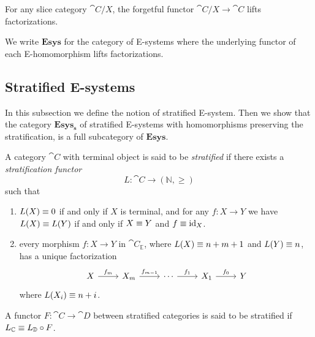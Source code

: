 \begin{eg}
For any slice category $\cat{C}/X$, the forgetful functor $\cat{C}/X\to\cat{C}$
lifts factorizations.
\end{eg}

\begin{defn}
We write $\mathbf{Esys}$ for the category of E-systems where the underlying
functor of each E-homomorphism lifts factorizations.
\end{defn}

\subsection{Stratified E-systems}

In this subsection we define the notion of stratified E-system. Then we show
that the category $\mathbf{Esys_s}$ of stratified E-systems with homomorphisms preserving the
stratification, is a full subcategory of $\mathbf{Esys}$. 

\begin{defn}
A category $\cat{C}$ with terminal object is said to be \emph{stratified} if there exists a 
\emph{stratification functor}
\begin{equation*}
L : \cat{C}\to (\mathbb{N},\geq)
\end{equation*}
such that
\begin{enumerate}
\item $L(X)\equiv 0$ if and only if $X$ is terminal, and for any $f:X\to Y$ we have
$L(X)\equiv L(Y)$ if and only if $X\equiv Y$ and $f\equiv{\mathrm{id}_{X}}$. 
\item every morphism $f:X\to Y$ in $\cat{C}_\mathbb{E}$, where $L(X)\equiv
n+m+1$ and $L(Y)\equiv n$, has a unique factorization 
\begin{equation*}
\begin{tikzcd}
X \arrow[r,"f_m"] & X_m \arrow[r,"f_{m-1}"] & \cdots \arrow[r,"f_1"] & X_1 \arrow[r,"f_0"] & Y
\end{tikzcd}
\end{equation*}
where $L(X_i)\equiv n+i$.
\end{enumerate}
A functor $F:\cat{C}\to\cat{D}$ between stratified categories is said to be stratified 
if $L_{\mathbb{C}}\equiv L_{\mathbb{D}}\circ F$. 
\end{defn}


